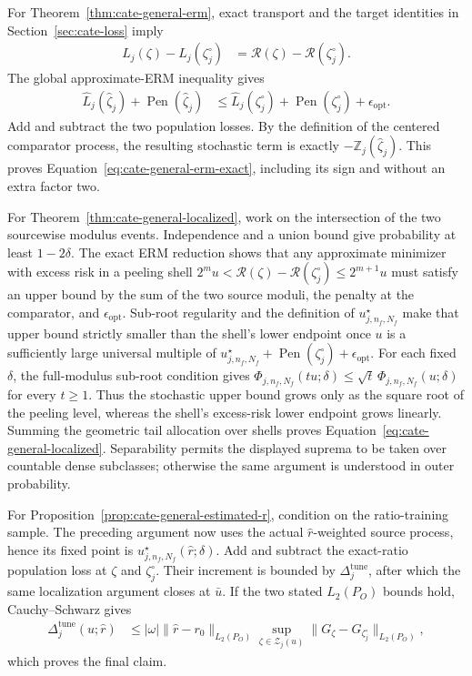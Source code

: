 For Theorem~\ref{thm:cate-general-erm}, exact transport and the target
identities in Section~\ref{sec:cate-loss} imply
\begin{align*}
L_j(\zeta)-L_j(\zeta_j^\circ)
&=\mathcal R(\zeta)-\mathcal R(\zeta_j^\circ).
\end{align*}
The global approximate-ERM inequality gives
\begin{align*}
\widehat L_j(\widehat\zeta_j)+\operatorname{Pen}(\widehat\zeta_j)
&\leq
\widehat L_j(\zeta_j^\circ)+\operatorname{Pen}(\zeta_j^\circ)
+\epsilon_{\mathrm{opt}}.
\end{align*}
Add and subtract the two population losses.  By the definition of the
centered comparator process, the resulting stochastic term is exactly
$-\mathbb Z_j(\widehat\zeta_j)$.  This proves
Equation~\eqref{eq:cate-general-erm-exact}, including its sign and without an
extra factor two.

For Theorem~\ref{thm:cate-general-localized}, work on the intersection of the
two sourcewise modulus events.  Independence and a union bound give probability
at least $1-2\delta$.  The exact ERM reduction shows that any approximate
minimizer with excess risk in a peeling shell
$2^m u<\mathcal R(\zeta)-\mathcal R(\zeta_j^\circ)\leq2^{m+1}u$
must satisfy an upper bound by the sum of the two source moduli, the penalty at
the comparator, and $\epsilon_{\mathrm{opt}}$.  Sub-root regularity and the
definition of $u_{j,n_f,N_f}^\star$ make that upper bound strictly smaller
than the shell's lower endpoint once $u$ is a sufficiently large universal
multiple of
$u_{j,n_f,N_f}^\star+\operatorname{Pen}(\zeta_j^\circ)
+\epsilon_{\mathrm{opt}}$. For each fixed $\delta$, the full-modulus
sub-root condition gives
$\Phi_{j,n_f,N_f}(tu;\delta)\leq
\sqrt{t}\,\Phi_{j,n_f,N_f}(u;\delta)$ for every $t\geq1$.
Thus the stochastic upper bound grows only as the square root of the peeling
level, whereas the shell's excess-risk lower endpoint grows linearly. Summing the
geometric tail allocation over shells proves
Equation~\eqref{eq:cate-general-localized}.  Separability permits the displayed
suprema to be taken over countable dense subclasses; otherwise the same
argument is understood in outer probability.

For Proposition~\ref{prop:cate-general-estimated-r}, condition on the
ratio-training sample.  The preceding argument now uses the actual
$\widehat r$-weighted source process, hence its fixed point is
$u_{j,n_f,N_f}^\star(\widehat r;\delta)$.  Add and subtract the exact-ratio
population loss at $\zeta$ and $\zeta_j^\circ$.  Their increment is bounded
by $\Delta_j^{\mathrm{tune}}$, after which the same localization argument
closes at $\bar u$.  If the two stated $L_2(P_O)$ bounds hold,
Cauchy--Schwarz gives
\begin{align*}
\Delta_j^{\mathrm{tune}}(u;\widehat r)
&\leq |\omega|\|\widehat r-r_0\|_{L_2(P_O)}
\sup_{\zeta\in\mathcal Z_j(u)}
\|G_\zeta-G_{\zeta_j^\circ}\|_{L_2(P_O)},
\end{align*}
which proves the final claim.


